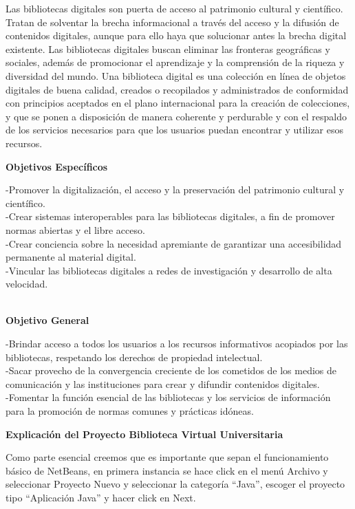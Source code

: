 \documentclass{article}
\begin{document}
\begin{multicols}{2}
Las bibliotecas digitales son puerta de acceso al patrimonio cultural y científico. Tratan de solventar la brecha informacional a través del acceso y la difusión de contenidos digitales, aunque para ello haya que solucionar antes la brecha digital existente. Las bibliotecas digitales buscan eliminar las fronteras geográficas y sociales, además de promocionar el aprendizaje y la comprensión de la riqueza y diversidad del mundo. Una biblioteca digital es una colección en línea de objetos digitales de buena calidad, creados o recopilados y administrados de conformidad con principios aceptados en el plano internacional para la creación de colecciones, y que se ponen a disposición de manera coherente y perdurable y con el respaldo de los servicios necesarios para que los usuarios puedan encontrar y utilizar esos recursos. \\
\begin{center}
\textbf{Objetivos Específicos} 
\end{center}
-Promover la digitalización, el acceso y la preservación del patrimonio cultural y científico. \\
-Crear sistemas interoperables para las bibliotecas digitales, a fin de promover normas abiertas y el libre acceso. \\
-Crear conciencia sobre la necesidad apremiante de garantizar una accesibilidad permanente al material digital. \\
-Vincular las bibliotecas digitales a redes de investigación y desarrollo de alta velocidad.
 \\ \\
\begin{center}
\textbf{Objetivo General} 
\end{center}
-Brindar acceso a todos los usuarios a los recursos informativos acopiados por las bibliotecas, respetando los derechos de propiedad intelectual. \\
-Sacar provecho de la convergencia creciente de los cometidos de los medios de comunicación y las instituciones para crear y difundir contenidos digitales. \\
-Fomentar la función esencial de las bibliotecas y los servicios de información para la promoción de normas comunes y prácticas idóneas. \\
\begin{center}
\textbf{Explicación del Proyecto Biblioteca Virtual Universitaria} 
\end{center}
Como parte esencial creemos que es importante que sepan el funcionamiento básico de NetBeans, en primera instancia se hace click en el menú Archivo y seleccionar Proyecto Nuevo y seleccionar la categoría “Java”, escoger el proyecto tipo “Aplicación Java” y hacer click en Next. \\

\end{multicols}
\end{document}
